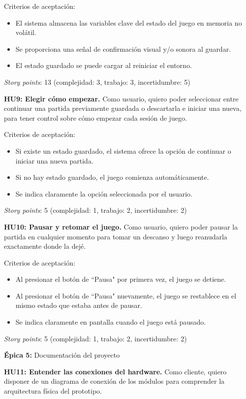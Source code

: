 \documentclass[
11pt, %
]{charter}
\begin{document}
	Criterios de aceptación:
	\begin{itemize}
		\item El sistema almacena las variables clave del estado del juego en memoria no volátil.
		\item Se proporciona una señal de confirmación visual y/o sonora al guardar.
		\item El estado guardado se puede cargar al reiniciar el entorno.
	\end{itemize}
	\textit{Story points}: 13 (complejidad: 3, trabajo: 3, incertidumbre: 5)
		
	\textbf{HU9: Elegir cómo empezar.} Como usuario, quiero poder seleccionar entre continuar una partida previamente guardada o descartarla e iniciar una nueva, para tener control sobre cómo empezar cada sesión de juego.

	Criterios de aceptación:
	\begin{itemize}
		\item Si existe un estado guardado, el sistema ofrece la opción de continuar o iniciar una nueva partida.
		\item Si no hay estado guardado, el juego comienza automáticamente.
		\item Se indica claramente la opción seleccionada por el usuario.
	\end{itemize}
	\textit{Story points}: 5 (complejidad: 1, trabajo: 2, incertidumbre: 2)

	\textbf{HU10: Pausar y retomar el juego.} Como usuario, quiero poder pausar la partida en cualquier momento para tomar un descanso y luego reanudarla exactamente donde la dejé.

	Criterios de aceptación:
	\begin{itemize}
		\item Al presionar el botón de ``Pausa" por primera vez, el juego se detiene.
		\item Al presionar el botón de ``Pausa" nuevamente, el juego se restablece en el mismo estado que estaba antes de pausar.
		\item Se indica claramente en pantalla cuando el juego está pausado.
	\end{itemize}
	\textit{Story points}: 5 (complejidad: 1, trabajo: 2, incertidumbre: 2)
		
\textbf{Épica 5:} Documentación del proyecto

	\textbf{HU11: Entender las conexiones del hardware.} Como cliente, quiero disponer de un diagrama de conexión de los módulos para comprender la arquitectura física del prototipo.
\end{document}
